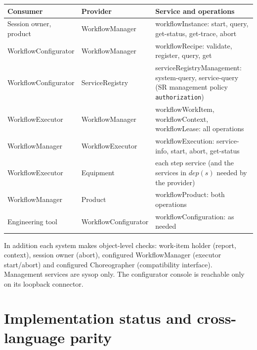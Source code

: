 \documentclass[a4paper]{arrowhead}
\begin{document}
{\small
\begin{longtable}{|p{3.6cm}|p{3.2cm}|p{9.0cm}|}

\hline
\rowcolor{gray!33} Consumer & Provider & Service and operations \\ \hline
\endhead
Session owner, product & WorkflowManager & workflowInstance: start, query, get-status, get-trace, abort \\ \hline
WorkflowConfigurator & WorkflowManager & workflowRecipe: validate, register, query, get \\ \hline
WorkflowConfigurator & ServiceRegistry & serviceRegistryManagement: system-query, service-query (SR management policy \texttt{authorization}) \\ \hline
WorkflowExecutor & WorkflowManager & workflowWorkItem, workflowContext, workflowLease: all operations \\ \hline
WorkflowManager & WorkflowExecutor & workflowExecution: service-info, start, abort, get-status \\ \hline
WorkflowExecutor & Equipment & each step service (and the services in $dep(s)$ needed by the provider) \\ \hline
WorkflowManager & Product & workflowProduct: both operations \\ \hline
Engineering tool & WorkflowConfigurator & workflowConfiguration: as needed \\ \hline
\end{longtable}
}

In addition each system makes object-level checks: work-item holder (report, context), session owner (abort),
configured WorkflowManager (executor start/abort) and configured Choreographer (compatibility interface). Management
services are sysop only. The configurator console is reachable only on its loopback connector.

\section{Implementation status and cross-language parity}
\label{sec:status}
\end{document}
